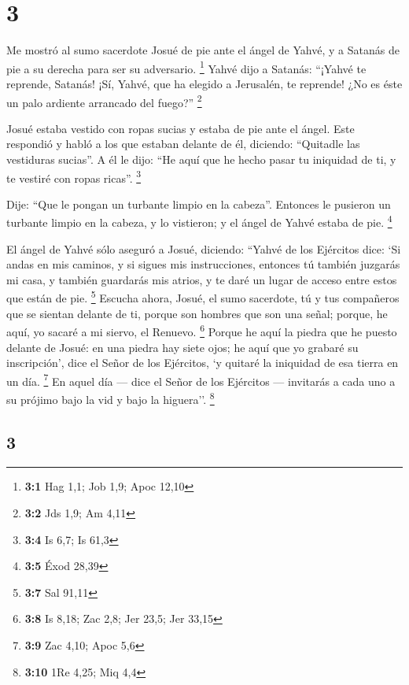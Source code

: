 \begin{paracol}{2}
\hypertarget{section-4}{%
\section{3}\label{section-4}}

 Me mostró al sumo sacerdote Josué de pie ante el ángel de
Yahvé, y a Satanás de pie a su derecha para ser su adversario.
\footnote{\textbf{3:1} Hag 1,1; Job 1,9; Apoc 12,10} 
Yahvé dijo a Satanás: ``¡Yahvé te reprende, Satanás! ¡Sí, Yahvé, que ha
elegido a Jerusalén, te reprende! ¿No es éste un palo ardiente arrancado
del fuego?'' \footnote{\textbf{3:2} Jds 1,9; Am 4,11}

 Josué estaba vestido con ropas sucias y estaba de pie
ante el ángel.  Este respondió y habló a los que estaban
delante de él, diciendo: ``Quitadle las vestiduras sucias''. A él le
dijo: ``He aquí que he hecho pasar tu iniquidad de ti, y te vestiré con
ropas ricas''. \footnote{\textbf{3:4} Is 6,7; Is 61,3}

 Dije: ``Que le pongan un turbante limpio en la cabeza''.
Entonces le pusieron un turbante limpio en la cabeza, y lo vistieron; y
el ángel de Yahvé estaba de pie. \footnote{\textbf{3:5} Éxod 28,39}

 El ángel de Yahvé sólo aseguró a Josué, diciendo:
 ``Yahvé de los Ejércitos dice: `Si andas en mis caminos,
y si sigues mis instrucciones, entonces tú también juzgarás mi casa, y
también guardarás mis atrios, y te daré un lugar de acceso entre estos
que están de pie. \footnote{\textbf{3:7} Sal 91,11} 
Escucha ahora, Josué, el sumo sacerdote, tú y tus compañeros que se
sientan delante de ti, porque son hombres que son una señal; porque, he
aquí, yo sacaré a mi siervo, el Renuevo. \footnote{\textbf{3:8} Is 8,18;
  Zac 2,8; Jer 23,5; Jer 33,15}  Porque he aquí la piedra
que he puesto delante de Josué: en una piedra hay siete ojos; he aquí
que yo grabaré su inscripción', dice el Señor de los Ejércitos, `y
quitaré la iniquidad de esa tierra en un día. \footnote{\textbf{3:9} Zac
  4,10; Apoc 5,6}  En aquel día --- dice el Señor de los
Ejércitos --- invitarás a cada uno a su prójimo bajo la vid y bajo la
higuera''. \footnote{\textbf{3:10} 1Re 4,25; Miq 4,4}

\switchcolumn
\begin{otherlanguage}{english}

\hypertarget{section-5}{%
\section{3}\label{section-5}}


\end{otherlanguage}
\end{paracol}
